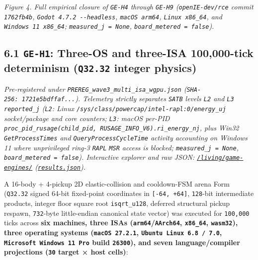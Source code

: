 \documentclass[10pt,letterpaper]{article}
\begin{document}
\emph{Figure 4. Full empirical closure of \texttt{GE-H4} through
\texttt{GE-H9} (\texttt{openIE-\allowbreak{}dev/\allowbreak{}rce} commit \texttt{1762fb4b},
\texttt{Godot\ 4.\allowbreak{}7.\allowbreak{}2\ -\allowbreak{}\/\allowbreak{}-\allowbreak{}headless}, \texttt{macOS\ arm64},
\texttt{Linux\ x86\_\allowbreak{}64}, and \texttt{Windows\ 11\ x86\_\allowbreak{}64};
\texttt{measured\_\allowbreak{}j\ =\ None}, \texttt{board\_\allowbreak{}metered\ =\ false}).}

\subsection{\texorpdfstring{6.1 \texttt{GE-H1}: Three-OS and three-ISA
100,000-tick determinism (\texttt{Q32.32} integer
physics)}{6.1 GE-H1: Three-OS and three-ISA 100,000-tick determinism (Q32.32 integer physics)}}\label{ge-h1-three-os-and-three-isa-100000-tick-determinism-q32.32-integer-physics}

\emph{Pre-registered under \texttt{PREREG\_\allowbreak{}wave3\_\allowbreak{}multi\_\allowbreak{}isa\_\allowbreak{}wgpu.\allowbreak{}json}
(\texttt{SHA-\allowbreak{}256:\ 1721e5bdffaf.\allowbreak{}.\allowbreak{}.\allowbreak{}}). Telemetry strictly separates
\texttt{SATB} levels \texttt{L2} and \texttt{L3} \texttt{reported\_\allowbreak{}j}
(\texttt{L2}: Linux \texttt{/\allowbreak{}sys/\allowbreak{}class/\allowbreak{}powercap/\allowbreak{}intel-\allowbreak{}rapl:0/\allowbreak{}energy\_\allowbreak{}uj}
socket/package and core counters; \texttt{L3}: macOS per-PID
\texttt{proc\_\allowbreak{}pid\_\allowbreak{}rusage(\allowbreak{}child\_\allowbreak{}pid,\allowbreak{}\ RUSAGE\_\allowbreak{}INFO\_\allowbreak{}V6).\allowbreak{}ri\_\allowbreak{}energy\_\allowbreak{}nj},
plus Win32 \texttt{GetProcessTimes} and \texttt{QueryProcessCycleTime}
activity accounting on Windows 11 where unprivileged ring-3
\texttt{RAPL} \texttt{MSR} access is blocked;
\texttt{measured\_\allowbreak{}j\ =\ None}, \texttt{board\_\allowbreak{}metered\ =\ false}).
Interactive explorer and raw JSON:
\href{https://research.openie.dev/living/game-engines/}{\texttt{/\allowbreak{}living/\allowbreak{}game-\allowbreak{}engines/\allowbreak{}}}
(\href{https://research.openie.dev/living/game-engines/results.json}{\texttt{results.\allowbreak{}json}}).}

A 16-body + 4-pickup 2D elastic-collision and cooldown-FSM arena Form
(\texttt{Q32.32} signed 64-bit fixed-point coordinates in
\texttt{{[}-64,\ +64{]}}, \texttt{128}-bit intermediate products,
integer floor square root \texttt{isqrt\_\allowbreak{}u128}, deferred structural
pickup respawn, \texttt{732}-byte little-endian canonical state vector)
was executed for \texttt{100,000} ticks across \textbf{six machines,
three ISAs (\texttt{arm64}/\allowbreak{}\texttt{AArch64}, \texttt{x86\_64},
\texttt{wasm32}), three operating systems (\texttt{macOS\ 27.\allowbreak{}2.\allowbreak{}1},
\texttt{Ubuntu\ Linux\ 6.\allowbreak{}8\ /\allowbreak{}\ 7.\allowbreak{}0},
\texttt{Microsoft\ Windows\ 11\ Pro} build \texttt{26300}), and seven
language/compiler projections (\texttt{30} target × host cells)}:
\end{document}
